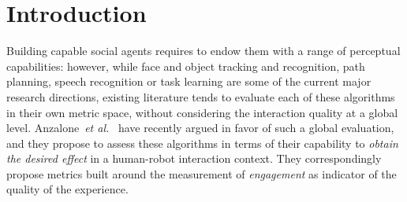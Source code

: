 \documentclass{sig-alternate}
\newcommand{\etal}{\textit{et al.}\xspace}
\begin{document}



\section{Introduction}

%

Building capable social agents requires to endow them with a range of perceptual
capabilities: however, while face and object tracking and recognition, path
planning, speech recognition or task learning are some of the current major
research directions, existing literature tends to evaluate each of these
algorithms in their own metric space, without considering the interaction
quality at a global level. Anzalone~\etal~\cite{anzalone} have recently argued
in favor of such a global evaluation, and they propose to assess these
algorithms in terms of their capability to \emph{obtain the desired effect} in a
human-robot interaction context. They correspondingly propose metrics built
around the measurement of \emph{engagement} as indicator of the quality of the
experience.
\end{document}
